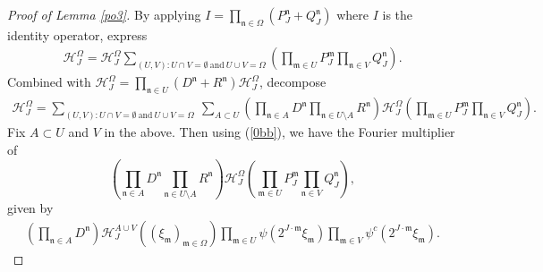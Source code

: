 \documentclass[11 pt,letterpaper]{amsart}
\theoremstyle{plain}
\theoremstyle{definition}
\theoremstyle{remark} \theoremstyle{exam} \theoremstyle{ob}
\numberwithin{equation}{section}
\begin{document}
\begin{proof}[Proof of Lemma \ref{po3}]
	 By applying $I=\prod_{\mathfrak{n}\in \Omega} (P_J^{\mathfrak{n}} +  Q_J^{\mathfrak{n}}) $ where $I$ is the identity operator, express 
	\begin{align}
		\mathcal{H}^{\Omega}_J=\mathcal{H}^{\Omega}_J \sum_{(U,V): U\cap V=\emptyset \  \text{and}\ U\cup V=\Omega} \left( \prod_{\mathfrak{m}\in U}P_J^{\mathfrak{m}}  \prod_{\mathfrak{n}\in V}Q_J^{\mathfrak{n}} \right).
	\end{align}
	Combined with $\mathcal{H}^{\Omega}_J= \prod_{\mathfrak{n}\in U}( D^{\mathfrak{n}} + R^{\mathfrak{n}})\mathcal{H}^{\Omega}_J $, decompose  
	\begin{align}\label{ss33}
		\mathcal{H}^{\Omega}_J=  \sum_{(U,V): U\cap V=\emptyset \  \text{and}\ U\cup V=\Omega} \ \sum_{A\subset U} \left(\prod_{\mathfrak{n}\in   A} D^{\mathfrak{n}}\prod_{\mathfrak{n}\in U\setminus A} R^{\mathfrak{n}}\right)\mathcal{H}^{\Omega}_J \left(\prod_{\mathfrak{m}\in U}  P_J^{\mathfrak{m}}  \prod_{\mathfrak{n}\in V}Q_J^{\mathfrak{n}}\right). 
	\end{align}
	Fix $A\subset U$ and $V$ in the above.  Then using (\ref{0bb}), we have the Fourier multiplier of $$\left(\prod_{\mathfrak{n}\in   A} D^{\mathfrak{n}}\prod_{\mathfrak{n}\in U\setminus A} R^{\mathfrak{n}}\right)\mathcal{H}^{\Omega}_J \left(\prod_{\mathfrak{m}\in U}  P_J^{\mathfrak{m}}  \prod_{\mathfrak{n}\in V}Q_J^{\mathfrak{n}}\right),$$ given by
	\begin{align*}
		\left( \prod_{\mathfrak{n}\in   A} D^{\mathfrak{n}} \right)\mathcal{H}_J^{A\cup V} \left((\xi_{\mathfrak{m}} )_{\mathfrak{m}\in \Omega} \right) \prod_{\mathfrak{m}\in U}  \psi \left(2^{J\cdot \mathfrak{m}} \xi_{\mathfrak{m}} \right)    \prod_{\mathfrak{m}\in V}\psi^c\left(2^{J\cdot \mathfrak{m}} \xi_{\mathfrak{m}} \right).  
	\end{align*}
	

\end{proof}
\end{document}
